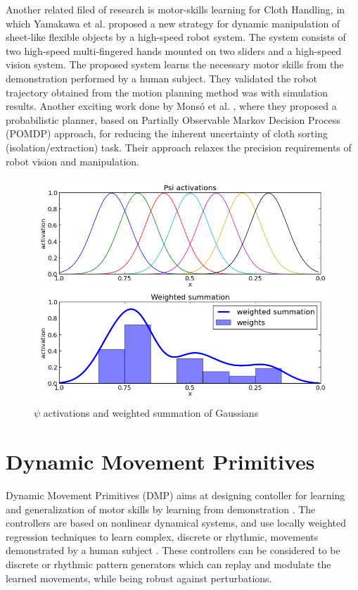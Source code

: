 \documentclass[sigconf]{acmart}
\begin{document}
Another related filed of research is motor-skills learning for Cloth Handling, in which Yamakawa et al. \cite{yamakawa2011dynamic} proposed a new strategy for dynamic manipulation of sheet-like flexible objects by a high-speed robot system. The system consists of two high-speed multi-fingered hands mounted on two sliders and a high-speed vision system. The proposed system learns the necessary motor skills from the demonstration performed by a human subject. They validated the robot trajectory obtained from the motion planning method was with simulation results. Another exciting work done by Mons{\'o} et al. \cite{monso2012pomdp}, where they proposed a probabilistic planner, based on Partially Observable Markov Decision Process (POMDP) approach, for reducing the inherent uncertainty of cloth sorting (isolation/extraction) task. Their approach relaxes the precision requirements of robot vision and manipulation.

\begin{figure}
	\includegraphics[width=\linewidth]{psi}
	\caption{$\psi$ activations and weighted summation of Gaussians}
	\label{fig:psi_activations}
\end{figure}

\section{Dynamic Movement Primitives}
\label{sec:dmp}
Dynamic Movement Primitives (DMP) aims at designing contoller for learning and generalization of motor skills by learning from demonstration \cite{ijspeert2003learning}. The controllers are based on nonlinear dynamical systems, and use locally weighted regression techniques to learn complex, discrete or rhythmic, movements demonstrated by a human subject \cite{ijspeert2002movement}. These controllers can be considered to be discrete or rhythmic pattern generators which can replay and modulate the learned movements, while being robust against perturbations.
\end{document}
